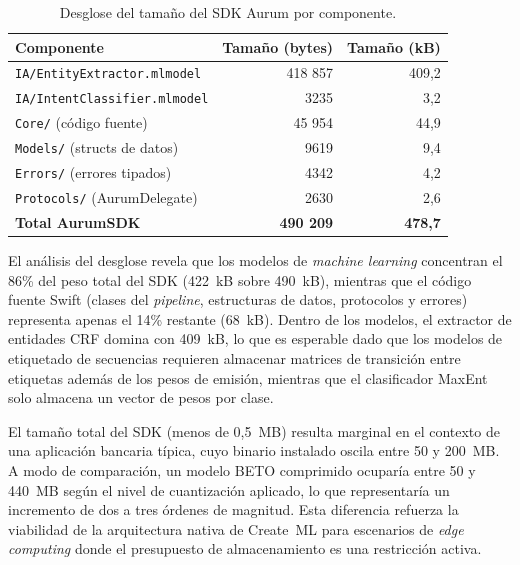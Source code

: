 \begin{table}[H]
\caption{Desglose del tamaño del SDK Aurum por componente.}
\centering
\begin{tabular}{@{}lrr@{}}
\toprule
\textbf{Componente} & \textbf{Tamaño (bytes)} & \textbf{Tamaño (kB)} \\
\midrule
\texttt{IA/EntityExtractor.mlmodel}  & 418 857 & 409,2 \\
\texttt{IA/IntentClassifier.mlmodel} & 3235   & 3,2   \\
\texttt{Core/} (código fuente)       & 45 954  & 44,9  \\
\texttt{Models/} (structs de datos)  & 9619   & 9,4   \\
\texttt{Errors/} (errores tipados)   & 4342   & 4,2   \\
\texttt{Protocols/} (AurumDelegate)  & 2630   & 2,6   \\
\midrule
\textbf{Total AurumSDK}             & \textbf{490 209} & \textbf{478,7} \\
\bottomrule
\end{tabular}
\label{tab:huella-sdk}
\end{table}

El análisis del desglose revela que los modelos de \textit{machine learning} concentran el 86\% del peso total del SDK (422~kB sobre 490~kB), mientras que el código fuente Swift (clases del \textit{pipeline}, estructuras de datos, protocolos y errores) representa apenas el 14\% restante (68~kB). Dentro de los modelos, el extractor de entidades CRF domina con 409~kB, lo que es esperable dado que los modelos de etiquetado de secuencias requieren almacenar matrices de transición entre etiquetas además de los pesos de emisión, mientras que el clasificador MaxEnt solo almacena un vector de pesos por clase.

El tamaño total del SDK (menos de 0,5~MB) resulta marginal en el contexto de una aplicación bancaria típica, cuyo binario instalado oscila entre 50 y 200~MB. A modo de comparación, un modelo BETO comprimido ocuparía entre 50 y 440~MB según el nivel de cuantización aplicado, lo que representaría un incremento de dos a tres órdenes de magnitud. Esta diferencia refuerza la viabilidad de la arquitectura nativa de Create~ML para escenarios de \textit{edge computing} donde el presupuesto de almacenamiento es una restricción activa.

